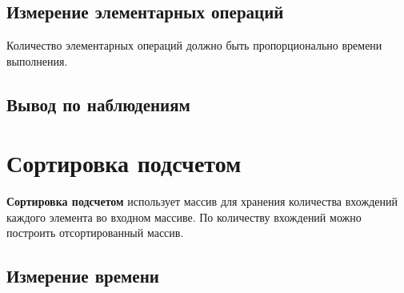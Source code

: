 \documentclass[11pt]{article}
\begin{document}
\subsection{Измерение элементарных операций}

\begin{center}
\end{center}
{ \hspace*{\fill} }

\begin{center}
\end{center}
{ \hspace*{\fill} }

Количество элементарных операций должно быть пропорционально времени выполнения.

\subsection{Вывод по наблюдениям}

\newpage

\setcounter{section}{7}
\section*{\centering Сортировка подсчетом}

\textbf{Сортировка подсчетом} использует массив для хранения количества вхождений каждого
элемента во входном массиве. По количеству вхождений можно построить отсортированный массив.

\setcounter{subsection}{0}
\subsection{Измерение времени}

\begin{center}
\end{center}
{ \hspace*{\fill} }

\begin{center}
\end{center}
{ \hspace*{\fill} }
\end{document}
